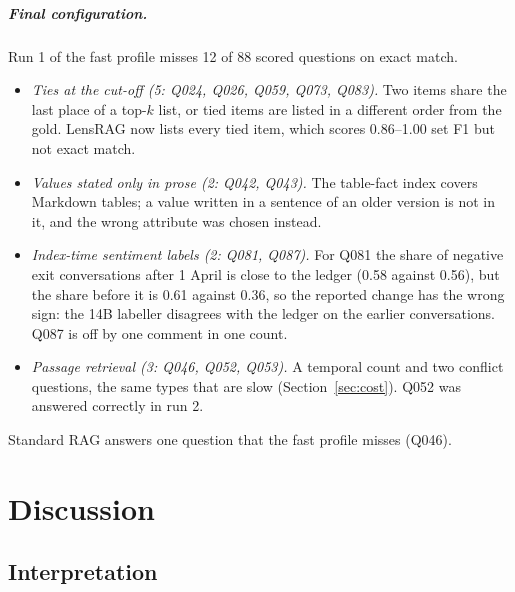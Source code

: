 \documentclass[11pt,letterpaper,oneside]{report}
\begin{document}
\paragraph{Final configuration.}
Run 1 of the fast profile misses 12 of 88 scored questions on exact match.
\begin{itemize}
  \item \emph{Ties at the cut-off (5: Q024, Q026, Q059, Q073, Q083).} Two
  items share the last place of a top-$k$ list, or tied items are listed in
  a different order from the gold. LensRAG now lists every tied item, which
  scores 0.86--1.00 set F1 but not exact match.
  \item \emph{Values stated only in prose (2: Q042, Q043).} The table-fact
  index covers Markdown tables; a value written in a sentence of an older
  version is not in it, and the wrong attribute was chosen instead.
  \item \emph{Index-time sentiment labels (2: Q081, Q087).} For Q081 the
  share of negative exit conversations after 1 April is close to the ledger
  (0.58 against 0.56), but the share before it is 0.61 against 0.36, so the
  reported change has the wrong sign: the 14B labeller disagrees with the
  ledger on the earlier conversations. Q087 is off by one comment in one
  count.
  \item \emph{Passage retrieval (3: Q046, Q052, Q053).} A temporal count and
  two conflict questions, the same types that are slow
  (Section~\ref{sec:cost}). Q052 was answered correctly in run 2.
\end{itemize}
Standard RAG answers one question that the fast profile misses (Q046).

\chapter{Discussion}
\label{ch:discussion}

\section{Interpretation}
\label{sec:interpretation}
\end{document}
